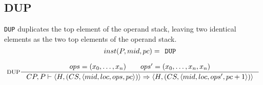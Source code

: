 \subsection{DUP}
\texttt{DUP} duplicates the top element of the operand stack, leaving two identical elements as the two top elements of the operand stack.
$$\inference[DUP]{ 
inst(P, mid, pc) = \texttt{DUP} \semnl \\
ops = (x_0, \ldots,x_n)\semsp
ops' = (x_0, \ldots, x_{n}, x_{n})
}
{CP, P \vdash \langle H, (CS, \langle mid, loc, ops, pc \rangle)\rangle \Rightarrow \langle H, (CS, \langle mid, loc, ops', pc + 1 \rangle)\rangle
}$$

